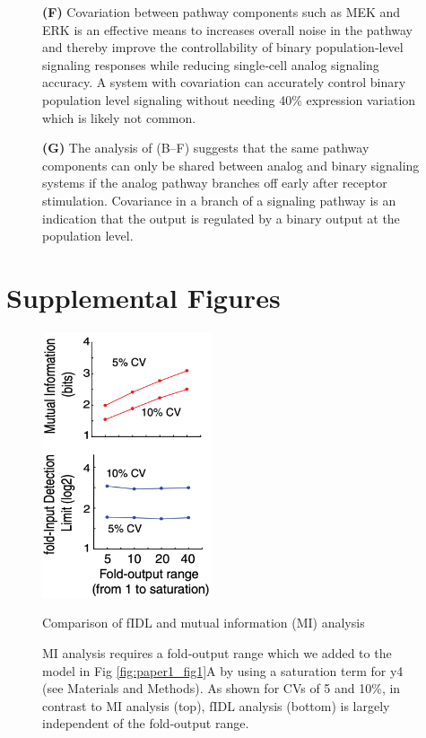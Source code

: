 \begin{figure}[hbt!]
{\textbf{(F)} Covariation between pathway components such as MEK and ERK is an effective means to increases overall noise in the pathway and thereby improve the controllability of binary population‐level signaling responses while reducing single‐cell analog signaling accuracy. A system with covariation can accurately control binary population level signaling without needing 40\% expression variation which is likely not common.

\textbf{(G)} The analysis of (B–F) suggests that the same pathway components can only be shared between analog and binary signaling systems if the analog pathway branches off early after receptor stimulation. Covariance in a branch of a signaling pathway is an indication that the output is regulated by a binary output at the population level.
}
\label{fig:paper1_fig8}
\end{figure}

\section{Supplemental Figures}
\beginsupplement

\begin{figure}[hbt!]
\centering
\includegraphics[width=5cm, keepaspectratio]{figs/paper1/figS1.png}
\caption{Comparison of fIDL and mutual information (MI) analysis}
\caption*{MI analysis requires a fold‐output range which we added to the model in Fig \ref{fig:paper1_fig1}A by using a saturation term for y4 (see Materials and Methods). As shown for CVs of 5 and 10\%, in contrast to MI analysis (top), fIDL analysis (bottom) is largely independent of the fold‐output range.
}
\label{fig:paper1_figS1}
\end{figure}

